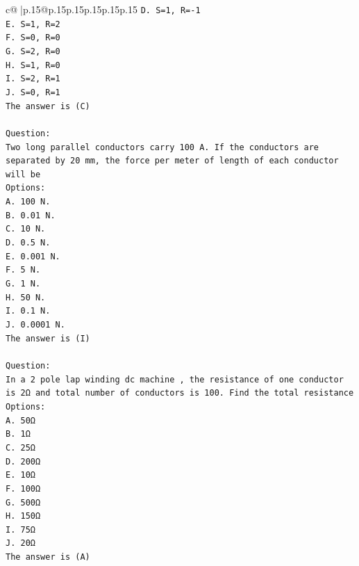\documentclass{article}
\begin{document}
{\begin{supertabular}{c@{$\;$}|p{.15\linewidth}@{}p{.15\linewidth}p{.15\linewidth}p{.15\linewidth}p{.15\linewidth}p{.15\linewidth}}
{{{\texttt{D. S=1, R={-}1} \\
\texttt{E. S=1, R=2} \\
\texttt{F. S=0, R=0} \\
\texttt{G. S=2, R=0} \\
\texttt{H. S=1, R=0} \\
\texttt{I. S=2, R=1} \\
\texttt{J. S=0, R=1} \\
\texttt{The answer is (C)} \\
\\ 
\texttt{Question:} \\
\texttt{Two long parallel conductors carry 100 A. If the conductors are separated by 20 mm, the force per meter of length of each conductor will be} \\
\texttt{Options:} \\
\texttt{A. 100 N.} \\
\texttt{B. 0.01 N.} \\
\texttt{C. 10 N.} \\
\texttt{D. 0.5 N.} \\
\texttt{E. 0.001 N.} \\
\texttt{F. 5 N.} \\
\texttt{G. 1 N.} \\
\texttt{H. 50 N.} \\
\texttt{I. 0.1 N.} \\
\texttt{J. 0.0001 N.} \\
\texttt{The answer is (I)} \\
\\ 
\texttt{Question:} \\
\texttt{In a 2 pole lap winding dc machine , the resistance of one conductor is 2Ω and total number of conductors is 100. Find the total resistance} \\
\texttt{Options:} \\
\texttt{A. 50Ω} \\
\texttt{B. 1Ω} \\
\texttt{C. 25Ω} \\
\texttt{D. 200Ω} \\
\texttt{E. 10Ω} \\
\texttt{F. 100Ω} \\
\texttt{G. 500Ω} \\
\texttt{H. 150Ω} \\
\texttt{I. 75Ω} \\
\texttt{J. 20Ω} \\
\texttt{The answer is (A)} \\
\\ 
}}}
\end{supertabular}}
\end{document}
